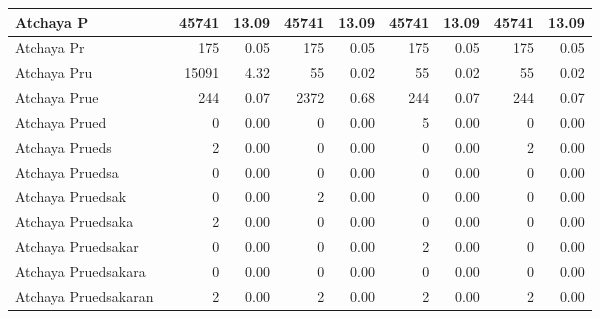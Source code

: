 \begin{table}[!htb]
\begin{center}
{\begin{tabular}{ | l | r | r | r | r | r | r | r | r | }
    \hline                   
    Atchaya P                 & 45741 & 13.09 & 45741 & 13.09 & 45741 & 13.09 & 45741 & 13.09 \\
    \hline                   
    Atchaya Pr                & 175 & 0.05 & 175 & 0.05 & 175 & 0.05 & 175 & 0.05 \\
    \hline                   
    Atchaya Pru               & \cellcolor{green} 15091 & 4.32 & 55 & 0.02 & 55 & 0.02 & 55 & 0.02 \\
    \hline                   
    Atchaya Prue              & 244 & 0.07 & \cellcolor{green} 2372 & 0.68 & 244 & 0.07 & 244 & 0.07 \\
    \hline                   
    Atchaya Prued             & 0 & 0.00 & 0 & 0.00 & \cellcolor{green} 5 & 0.00 & 0 & 0.00 \\
    \hline                   
    Atchaya Prueds            & \cellcolor{green} 2 & 0.00 & 0 & 0.00 & 0 & 0.00 & \cellcolor{green} 2 & 0.00 \\
    \hline                   
    Atchaya Pruedsa           & 0 & 0.00 & 0 & 0.00 & 0 & 0.00 & 0 & 0.00 \\
    \hline                   
    Atchaya Pruedsak          & 0 & 0.00 & \cellcolor{green} 2 & 0.00 & 0 & 0.00 & 0 & 0.00 \\
    \hline                   
    Atchaya Pruedsaka         & \cellcolor{green} 2 & 0.00 & 0 & 0.00 & 0 & 0.00 & 0 & 0.00 \\
    \hline                   
    Atchaya Pruedsakar        & 0 & 0.00 & 0 & 0.00 & \cellcolor{green} 2 & 0.00 & 0 & 0.00 \\
    \hline                   
    Atchaya Pruedsakara       & 0 & 0.00 & 0 & 0.00 & 0 & 0.00 & 0 & 0.00 \\
    \hline                   
    Atchaya Pruedsakaran      & \cellcolor{green} 2 & 0.00 & \cellcolor{green} 2 & 0.00 & \cellcolor{green} 2 & 0.00 & \cellcolor{green} 2 & 0.00 \\
    \hline  
  \end{tabular}
}
\end{center}
\label{tableIndianName}
\end{table}


